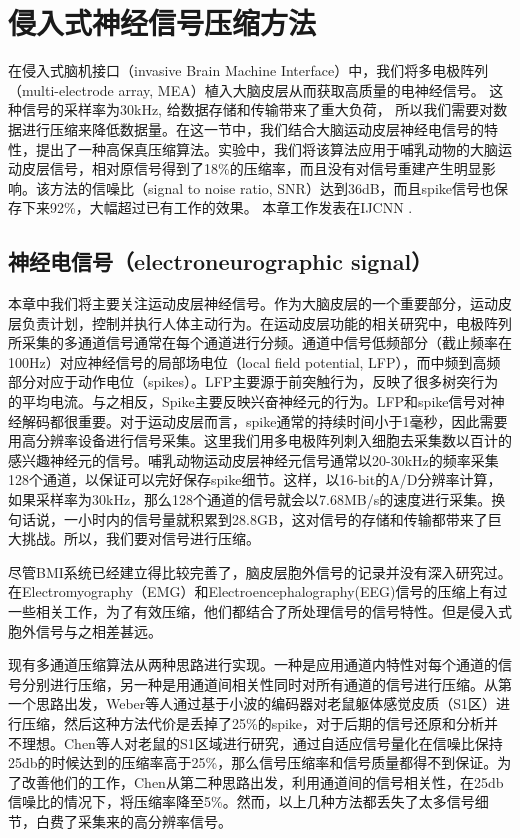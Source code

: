 \chapter{侵入式神经信号压缩方法}

在侵入式脑机接口（invasive Brain Machine Interface）中，我们将多电极阵列（multi-electrode array, MEA）植入大脑皮层从而获取高质量的电神经信号。 这种信号的采样率为30kHz, 给数据存储和传输带来了重大负荷， 所以我们需要对数据进行压缩来降低数据量。在这一节中，我们结合大脑运动皮层神经电信号的特性，提出了一种高保真压缩算法。实验中，我们将该算法应用于哺乳动物的大脑运动皮层信号，相对原信号得到了18\%的压缩率，而且没有对信号重建产生明显影响。该方法的信噪比（signal to noise ratio, SNR）达到36dB，而且spike信号也保存下来92\%，大幅超过已有工作的效果。 本章工作发表在IJCNN \cite{zhang2014high}.

\section{神经电信号（electroneurographic signal）}

本章中我们将主要关注运动皮层神经信号。作为大脑皮层的一个重要部分，运动皮层负责计划，控制并执行人体主动行为。在运动皮层功能的相关研究中，电极阵列所采集的多通道信号通常在每个通道进行分频。通道中信号低频部分（截止频率在100Hz）对应神经信号的局部场电位（local field potential, LFP），而中频到高频部分对应于动作电位（spikes）。LFP主要源于前突触行为，反映了很多树突行为的平均电流。与之相反，Spike主要反映兴奋神经元的行为。LFP和spike信号对神经解码都很重要。对于运动皮层而言，spike通常的持续时间小于1毫秒，因此需要用高分辨率设备进行信号采集。这里我们用多电极阵列刺入细胞去采集数以百计的感兴趣神经元的信号。哺乳动物运动皮层神经元信号通常以20-30kHz的频率采集128个通道，以保证可以完好保存spike细节。这样，以16-bit的A/D分辨率计算，如果采样率为30kHz，那么128个通道的信号就会以7.68MB/s的速度进行采集。换句话说，一小时内的信号量就积累到28.8GB，这对信号的存储和传输都带来了巨大挑战。所以，我们要对信号进行压缩。

尽管BMI系统已经建立得比较完善了，脑皮层胞外信号的记录并没有深入研究过。在Electromyography（EMG）和Electroencephalography(EEG)信号的压缩上有过一些相关工作\cite{24,25}，为了有效压缩，他们都结合了所处理信号的信号特性。但是侵入式胞外信号与之相差甚远。

现有多通道压缩算法从两种思路进行实现。一种是应用通道内特性对每个通道的信号分别进行压缩，另一种是用通道间相关性同时对所有通道的信号进行压缩。从第一个思路出发，Weber等人通过基于小波的编码器对老鼠躯体感觉皮质（S1区）进行压缩，然后这种方法代价是丢掉了25\%的spike，对于后期的信号还原和分析并不理想。Chen等人对老鼠的S1区域进行研究，通过自适应信号量化在信噪比保持25db的时候达到的压缩率高于25\%，那么信号压缩率和信号质量都得不到保证。为了改善他们的工作，Chen从第二种思路出发，利用通道间的信号相关性，在25db信噪比的情况下，将压缩率降至5\%。然而，以上几种方法都丢失了太多信号细节，白费了采集来的高分辨率信号。

